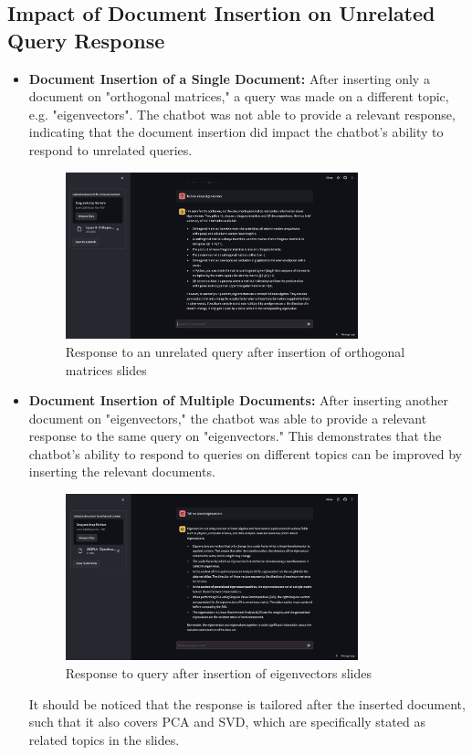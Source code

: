 \subsection{Impact of Document Insertion on Unrelated Query Response}
\begin{itemize}
    \item \textbf{Document Insertion of a Single Document:} After inserting only a document on "orthogonal matrices," a query was made on a different topic, e.g. "eigenvectors". The chatbot was not able to provide a relevant response, indicating that the document insertion did impact the chatbot's ability to respond to unrelated queries.
    \begin{figure}[H]
        \centering
        \includegraphics[width=0.8\textwidth]{figs/eigvectors.png}
        \caption{Response to an unrelated query after insertion of orthogonal matrices slides}
        \label{fig:unrelated_query}
    \end{figure}

    \item \textbf{Document Insertion of Multiple Documents:} After inserting another document on "eigenvectors," the chatbot was able to provide a relevant response to the same query on "eigenvectors." This demonstrates that the chatbot's ability to respond to queries on different topics can be improved by inserting the relevant documents.
    \begin{figure}[H]
        \centering
        \includegraphics[width=0.8\textwidth]{figs/eigvectors2.png}
        \caption{Response to query after insertion of eigenvectors slides}
        \label{fig:unrelated_query2}
    \end{figure}
    It should be noticed that the response is tailored after the inserted document, such that it also covers PCA and SVD, which are specifically stated as related topics in the slides.
\end{itemize}
